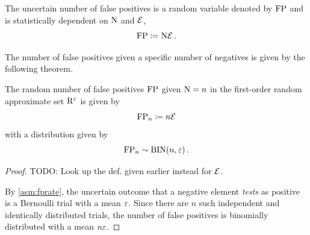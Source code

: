 \documentclass[10pt,final,hidelinks]{article}
\numberwithin{equation}{section}
\begin{document}
\begin{definition}
The uncertain number of false positives is a random variable denoted by $\mathrm{FP}$ and is statistically dependent on $\mathrm{N}$ and $\mathcal{E}$,
\begin{equation}
	\mathrm{FP} \coloneqq \mathrm{N} \mathcal{E}\,.
\end{equation}
\end{definition}

The number of false positives given a specific number of negatives is given by the following theorem.
\begin{theorem}
\label{thm:fpbinom}
The random number of false positives $\mathrm{FP}$ given $\mathrm{N} = n$ in the first-order random approximate set $\AT{\RV{R}}[\fprate]$ is given by
\begin{equation}
	\mathrm{FP}_n \coloneqq n \mathcal{E}
\end{equation}
with a distribution given by
\begin{equation}
    \mathrm{FP}_n \sim \mathrm{BIN}(n, \varepsilon)\,.
\end{equation}
\end{theorem}
\begin{proof}
TODO: Look up the def. given earlier instead for $\mathcal{E}$.

By \cref{asm:fprate}, the uncertain outcome that a negative element \emph{tests} as positive is a Bernoulli trial with a mean $\varepsilon$.
Since there are $n$ such independent and identically distributed trials, the number of false positives is binomially distributed with a mean $n \varepsilon$.
\end{proof}
\end{document}

